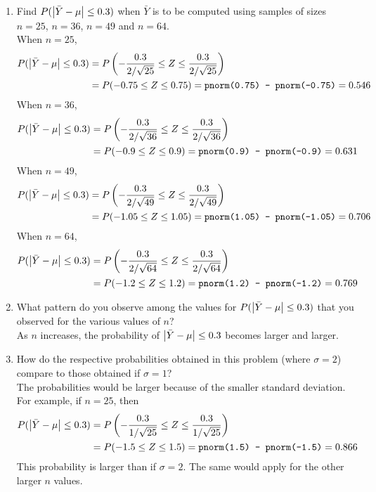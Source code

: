 \documentclass[12pt]{article}
\begin{document}
\begin{enumerate}
\item Find $P(\abs{\bar{Y} - \mu} \leq 0.3)$ when $\bar{Y}$ is to be computed using samples of sizes $n = 25$, $n=36$, $n=49$ and $n=64$. \\
When $n= 25$, $$ \begin{aligned} P(\abs{\bar{Y} - \mu} \leq 0.3)  &= P\left( -\frac{0.3}{2 / \sqrt{25}} \leq Z \leq \frac{0.3}{2 / \sqrt{25}}\right) \\ &= P(-0.75 \leq Z \leq 0.75) = \texttt{pnorm(0.75) - pnorm(-0.75)} = 0.546  \end{aligned} $$ 
When $n= 36$, $$ \begin{aligned} P(\abs{\bar{Y} - \mu} \leq 0.3)  &= P\left( -\frac{0.3}{2 / \sqrt{36}} \leq Z \leq \frac{0.3}{2 / \sqrt{36}}\right) \\ &= P(-0.9 \leq Z \leq 0.9) = \texttt{pnorm(0.9) - pnorm(-0.9)} = 0.631  \end{aligned} $$ 
When $n= 49$, $$ \begin{aligned} P(\abs{\bar{Y} - \mu} \leq 0.3)  &= P\left( -\frac{0.3}{2 / \sqrt{49}} \leq Z \leq \frac{0.3}{2 / \sqrt{49}}\right) \\ &= P(-1.05 \leq Z \leq 1.05) = \texttt{pnorm(1.05) - pnorm(-1.05)} = 0.706  \end{aligned} $$ 
When $n= 64$, $$ \begin{aligned} P(\abs{\bar{Y} - \mu} \leq 0.3)  &= P\left( -\frac{0.3}{2 / \sqrt{64}} \leq Z \leq \frac{0.3}{2 / \sqrt{64}}\right) \\ &= P(-1.2 \leq Z \leq 1.2) = \texttt{pnorm(1.2) - pnorm(-1.2)} = 0.769  \end{aligned} $$ 

\item What pattern do you observe among the values for $P(\abs{\bar{Y} - \mu} \leq 0.3)$ that you observed for the various values of $n$? \\
As $n$ increases, the probability of $\abs{\bar{Y} - \mu} \leq 0.3$ becomes larger and larger.

\item How do the respective probabilities obtained in this problem (where $\sigma=2$) compare to those obtained if $\sigma=1$? \\
The probabilities would be larger because of the smaller standard deviation. \\ For example, if $n= 25$, then 
$$ \begin{aligned} P(\abs{\bar{Y} - \mu} \leq 0.3)  &= P\left( -\frac{0.3}{1 / \sqrt{25}} \leq Z \leq \frac{0.3}{1 / \sqrt{25}}\right) \\ &= P(-1.5 \leq Z \leq 1.5) = \texttt{pnorm(1.5) - pnorm(-1.5)} = 0.866  \end{aligned} $$ This probability is larger than if $\sigma = 2$. The same would apply for the other larger $n$ values.

\end{enumerate}
\end{document}
